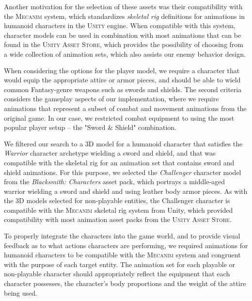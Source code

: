 Another motivation for the selection of these assets was their compatibility with the \textsc{Mecanim} system, which standardizes \emph{skeletal rig} definitions for animations in humanoid characters in the \textsc{Unity} engine. When compatible with this system, character models can be used in combination with most animations that can be found in the \textsc{Unity Asset Store}, which provides the possibility of choosing from a wide collection of animation sets, which also assists our enemy behavior design.



When considering the options for the player model, we require a character that would equip the appropriate attire or armor pieces, and should be able to wield common Fantasy-genre weapons such as swords and shields. The second criteria considers the gameplay aspects of our implementation, where we require animations that represent a subset of combat and movement animations from the original game. In our case, we restricted combat equipment to using the most popular player setup -- the "Sword \& Shield" combination.

We filtered our search to a 3D model for a humanoid character that satisfies the \emph{Warrior} character archetype wielding a sword and shield, and that was compatible with the skeletal rig for an animation set that contains sword and shield animations. For this purpose, we selected the \emph{Challenger} character model from the \emph{Blacksmith: Characters} asset pack, which portrays a middle-aged warrior wielding a sword and shield and using leather body armor pieces. As with the 3D models selected for non-playable entities, the Challenger character is compatible with the \textsc{Mecanim} skeletal rig system from Unity, which provided compatibility with most animation asset packs from the \textsc{Unity Asset Store}.

To properly integrate the characters into the game world, and to provide visual feedback as to what actions characters are performing, we required animations for humanoid characters to be compatible with the \textsc{Mecanim} system and congruent with the purpose of each target entity. The animation set for each playable or non-playable character should appropriately reflect the equipment that each character possesses, the character's body proportions and the weight of the attire being used.

